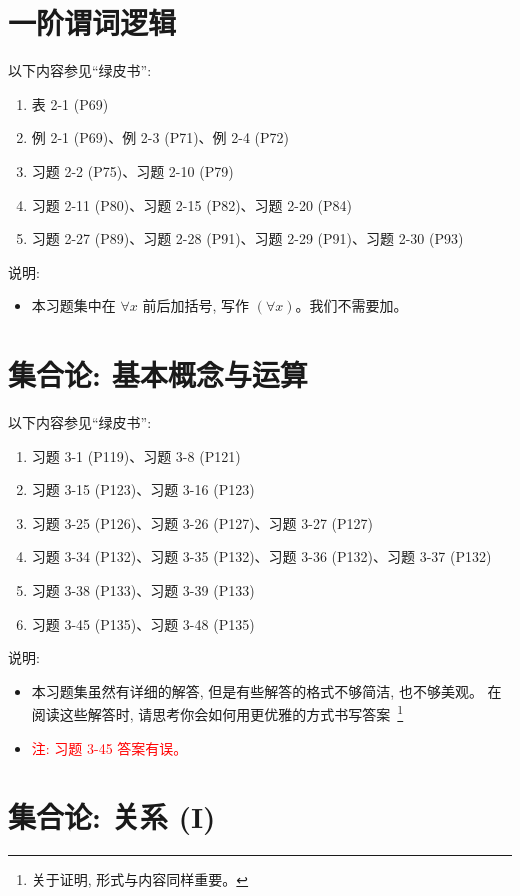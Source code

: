 \documentclass{article}
\begin{document}
\section{一阶谓词逻辑}

以下内容参见``绿皮书'':
\begin{enumerate}[(1)]
  \item 表 2-1 (P69)
  \item 例 2-1 (P69)、例 2-3 (P71)、例 2-4 (P72)
  \item 习题 2-2 (P75)、习题 2-10 (P79)
  \item 习题 2-11 (P80)、习题 2-15 (P82)、习题 2-20 (P84)
  \item 习题 2-27 (P89)、习题 2-28 (P91)、习题 2-29 (P91)、习题 2-30 (P93)
\end{enumerate}

说明:
\begin{itemize}
  \item 本习题集中在 $\forall x$ 前后加括号, 写作 $(\forall x)$。我们不需要加。
\end{itemize}
\section{集合论: 基本概念与运算}

以下内容参见``绿皮书'':
\begin{enumerate}[(1)]
  \item 习题 3-1 (P119)、习题 3-8 (P121)
  \item 习题 3-15 (P123)、习题 3-16 (P123)
  \item 习题 3-25 (P126)、习题 3-26 (P127)、习题 3-27 (P127)
  \item 习题 3-34 (P132)、习题 3-35 (P132)、习题 3-36 (P132)、习题 3-37 (P132)
  \item 习题 3-38 (P133)、习题 3-39 (P133)
  \item 习题 3-45 (P135)、习题 3-48 (P135)
\end{enumerate}

说明:
\begin{itemize}
  \item 本习题集虽然有详细的解答, 但是有些解答的格式不够简洁, 也不够美观。
    在阅读这些解答时, 请思考你会如何用更优雅的方式书写答案~\footnote{关于证明, 形式与内容同样重要。}
  \item \textcolor{red}{注: 习题 3-45 答案有误。}
\end{itemize}
\section{集合论: 关系 (I)}
\end{document}
